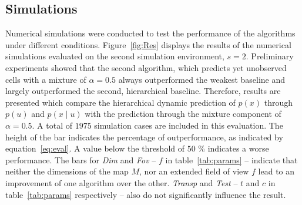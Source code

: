 \documentclass[twocolumn,letterpaper]{IEEEAerospaceCLS}  %
\begin{document}
\subsection{Simulations} \label{ssec:ResSim}
Numerical simulations were conducted to test the performance of the algorithms under different conditions. Figure~\ref{fig:Res} displays the results of the numerical simulations evaluated on the second simulation environment, $s=2$. Preliminary experiments showed that the second algorithm, which predicts yet unobserved cells with a mixture of $\alpha = 0.5$ always outperformed the weakest baseline and largely outperformed the second, hierarchical baseline. Therefore, results are presented which compare the hierarchical dynamic prediction of $p(x)$ through $p(u)$ and $p(x\mid u)$ with the prediction through the mixture component of $\alpha = 0.5$. A total of $1975$ simulation cases are included in this evaluation. The height of the bar indicates the percentage of outperformance, as indicated by equation~\ref{eq:eval}. A value below the threshold of $50$ \% indicates a worse performance.
The bars for \emph{Dim} and \emph{Fov} -- $f$ in table~\ref{tab:params} -- indicate that neither the dimensions of the map $M$, nor an extended field of view $f$ lead to an improvement of one algorithm over the other. \emph{Transp} and \emph{Test} -- $t$ and $c$ in table~\ref{tab:params} respectively -- also do not significantly influence the result.
\end{document}
